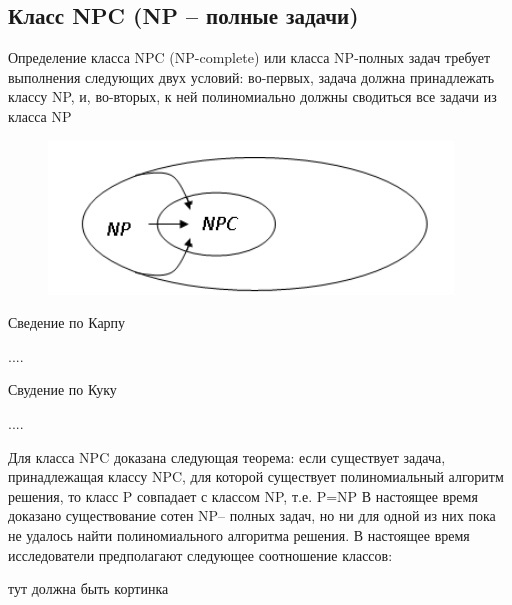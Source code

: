 \documentclass{article}
\begin{document}
  \subsection{Класс NPC (NP – полные задачи)}

  Определение класса NPC (NP-complete) или класса NP-полных задач
   требует выполнения следующих двух условий: во-первых,
    задача должна принадлежать классу NP, и, во-вторых,
     к ней полиномиально должны сводиться все задачи из класса NP

     \begin{figure} [H]
        \includegraphics[width=0.50\linewidth]{Снимок экрана 2025-03-25 093930.png}
    \end{figure}



    Сведение по Карпу

    ....

    Свудение по Куку

....

    Для класса NPC доказана следующая теорема:
     если существует задача, принадлежащая классу NPC,
      для которой существует полиномиальный алгоритм решения, то класс P совпадает с классом NP, т.е. P=NP
	В настоящее время доказано существование сотен NP– полных задач,
     но ни для одной из них пока не удалось найти полиномиального алгоритма решения.
      В настоящее время исследователи предполагают следующее соотношение классов:

      тут должна быть кортинка
\end{document}
